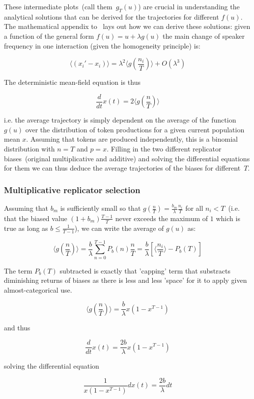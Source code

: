These intermediate plots~(call them~$g_T(u)$) are crucial in understanding the analytical solutions that can be derived for the trajectories for different $f(u)$. The mathematical appendix to~\citet{Blythe2012} lays out how we can derive these solutions: given a function of the general form $f(u)=u+\lambda g(u)$ the main change of speaker frequency in one interaction (given the homogeneity principle) is:

$$\langle(x_i'-x_i)\rangle=\lambda^2 \langle g(\frac{n_i}{T})\rangle + O(\lambda^3)$$

The deterministic mean-field equation is thus

$$\frac{d}{dt}x(t)=2\langle g(\frac{n}{T})\rangle$$

i.e. the average trajectory is simply dependent on the average of the function $g(u)$ over the distribution of token productions for a given current population mean $x$. Assuming that tokens are produced independently, this is a binomial distribution with $n=T$ and $p=x$. Filling in the two different replicator biases~(original multiplicative and additive) and solving the differential equations for them we can thus deduce the average trajectories of the biases for different~$T$.

\subsubsection{Multiplicative replicator selection}

Assuming that $b_m$ is sufficiently small so that $g(\frac{n}{T})=\frac{b_m}{\lambda}\frac{n_i}{T}$ for all $n_i<T$~(i.e. that the biased value $(1+b_m)\frac{T-1}{T}$ never exceeds the maximum of $1$ which is true as long as $b\le\frac{1}{T-1}$), we can write the average of $g(u)$ as:

$$\langle g(\frac{n}{T})\rangle=\frac{b}{\lambda}\sum_{n=0}^{T-1} P_b(n)\frac{n}{T}=\frac{b}{\lambda}[\langle\frac{n_i}{T}\rangle - P_b(T)]$$

The term $P_b(T)$ subtracted is exactly that 'capping' term that substracts diminishing returns of biases as there is less and less 'space' for it to apply given almost-categorical use.

$$\langle g(\frac{n}{T})\rangle=\frac{b}{\lambda}x(1-x^{T-1})$$

and thus

$$\frac{d}{dt}x(t)=\frac{2b}{\lambda}x(1-x^{T-1})$$

solving the differential equation

$$\frac{1}{x(1-x^{T-1})}dx(t)=\frac{2b}{\lambda}dt$$


